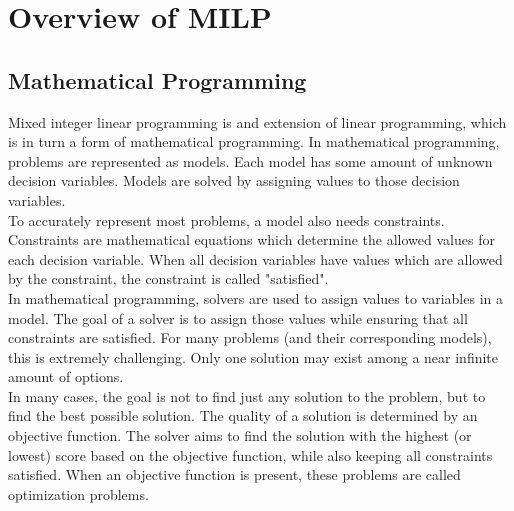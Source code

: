 \section{Overview of MILP}
\label{subsec:milp-overview}
\subsection{Mathematical Programming}
Mixed integer linear programming is and extension of linear programming, which is in turn a form of mathematical programming. In mathematical programming, problems are represented as models. Each model has some amount of unknown decision variables. Models are solved by assigning values to those decision variables. \\
To accurately represent most problems, a model also needs constraints. Constraints are mathematical equations which determine the allowed values for each decision variable. When all decision variables have values which are allowed by the constraint, the constraint is called "satisfied". \\
In mathematical programming, solvers are used to assign values to variables in a model. The goal of a solver is to assign those values while ensuring that all constraints are satisfied. For many problems (and their corresponding models), this is extremely challenging. Only one solution may exist among a near infinite amount of options. \\
In many cases, the goal is not to find just any solution to the problem, but to find the best possible solution. The quality of a solution is determined by an objective function. The solver aims to find the solution with the highest (or lowest) score based on the objective function, while also keeping all constraints satisfied. When an objective function is present, these problems are called optimization problems. \\
